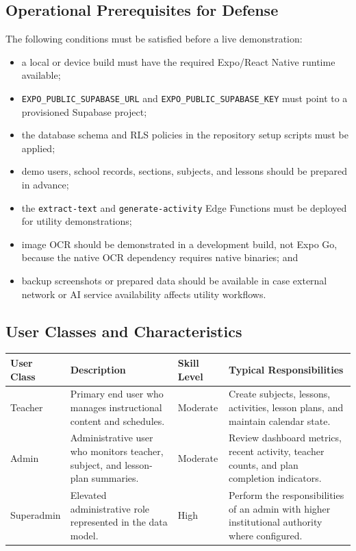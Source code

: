 \documentclass[12pt]{article}
\begin{document}
\subsection{Operational Prerequisites for Defense}

The following conditions must be satisfied before a live demonstration:
\begin{itemize}
\item a local or device build must have the required Expo/React Native runtime available;
\item \texttt{EXPO\_PUBLIC\_SUPABASE\_URL} and \texttt{EXPO\_PUBLIC\_SUPABASE\_KEY} must point to a provisioned Supabase project;
\item the database schema and RLS policies in the repository setup scripts must be applied;
\item demo users, school records, sections, subjects, and lessons should be prepared in advance;
\item the \texttt{extract-text} and \texttt{generate-activity} Edge Functions must be deployed for utility demonstrations;
\item image OCR should be demonstrated in a development build, not Expo Go, because the native OCR dependency requires native binaries; and
\item backup screenshots or prepared data should be available in case external network or AI service availability affects utility workflows.
\end{itemize}

\subsection{User Classes and Characteristics}

\begin{longtable}{|L{2.7cm}|L{3.7cm}|L{1.9cm}|L{4.7cm}|}
\hline
\textbf{User Class} & \textbf{Description} & \textbf{Skill Level} & \textbf{Typical Responsibilities} \\
\hline
Teacher & Primary end user who manages instructional content and schedules. & Moderate & Create subjects, lessons, activities, lesson plans, and maintain calendar state. \\
\hline
Admin & Administrative user who monitors teacher, subject, and lesson-plan summaries. & Moderate & Review dashboard metrics, recent activity, teacher counts, and plan completion indicators. \\
\hline
Superadmin & Elevated administrative role represented in the data model. & High & Perform the responsibilities of an admin with higher institutional authority where configured. \\
\hline
\end{longtable}
\end{document}
